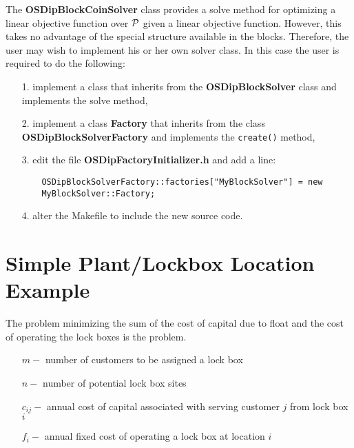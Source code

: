 \documentclass[11pt]{article}
\begin{document}
The {\bf OSDipBlockCoinSolver} class provides a solve method for optimizing a
linear objective function over ${\cal P}$ given a linear objective function.
However, this takes no advantage of the special structure available in the
blocks. Therefore, the user may wish to implement his or her own solver class.
In this case the user is required to do the following:
 
 \begin{itemize}
   
   \item[1.] implement a class that inherits from the {\bf OSDipBlockSolver}
   class and implements the solve method,
   
   \item[2.] implement a class {\bf Factory} that inherits from the class {\bf
OSDipBlockSolverFactory} and implements the {\tt create()} method,

	\item[3.] edit the file {\bf OSDipFactoryInitializer.h} and add a line:
	
	\begin{verbatim}
	OSDipBlockSolverFactory::factories["MyBlockSolver"] = new
	MyBlockSolver::Factory;
	\end{verbatim}
   
   \item[4.] alter the Makefile to include the new source code.
 \end{itemize}
 
 
 
 \section{Simple Plant/Lockbox Location Example}


 The problem minimizing
the sum of the cost of capital due to float  and the cost of operating the lock boxes is the
 problem.  

\begin{itemize}
\item[]  $m -$ number of customers to be assigned a lock box

\item[]  $n -$ number of potential lock box sites

\item[]  $c_{ij} -$ annual cost of capital associated with serving customer $j$ from lock box $i$ 

\item[]  $f_{i} -$  annual fixed cost of operating a lock box at location $i$
\end{itemize}
\end{document}
